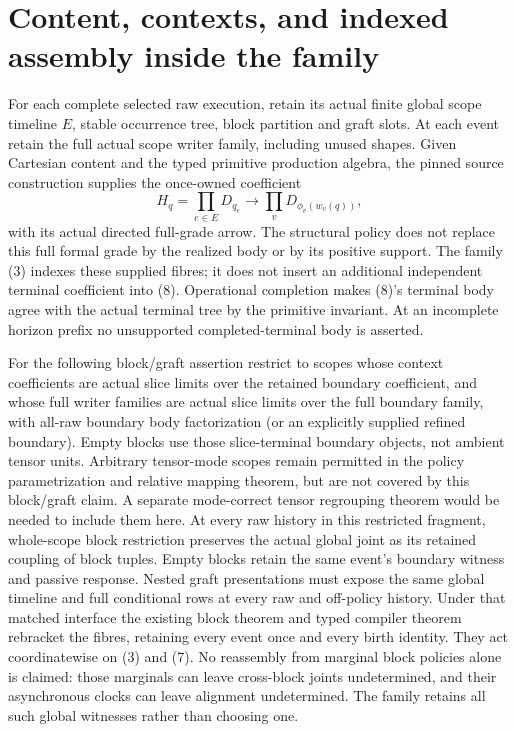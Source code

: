 \documentclass[11pt]{article}
\begin{document}
\section{Content, contexts, and indexed assembly inside the family}
For each complete selected raw execution, retain its actual finite global scope timeline $E$, stable occurrence tree, block partition and graft slots. At each event retain the full actual scope writer family, including unused shapes. Given Cartesian content and the typed primitive production algebra, the pinned source construction supplies the once-owned coefficient
\[
 H_q=\prod_{e\in E}D_{q_e}
 \longrightarrow\prod_{v}D_{\phi_v(w_v(q))},           \tag{8}
\]
with its actual directed full-grade arrow. The structural policy does not replace this full formal grade by the realized body or by its positive support. The family (3) indexes these supplied fibres; it does not insert an additional independent terminal coefficient into (8). Operational completion makes (8)'s terminal body agree with the actual terminal tree by the primitive invariant. At an incomplete horizon prefix no unsupported completed-terminal body is asserted.

For the following block/graft assertion restrict to scopes whose context coefficients are actual slice limits over the retained boundary coefficient, and whose full writer families are actual slice limits over the full boundary family, with all-raw boundary body factorization (or an explicitly supplied refined boundary). Empty blocks use those slice-terminal boundary objects, not ambient tensor units. Arbitrary tensor-mode scopes remain permitted in the policy parametrization and relative mapping theorem, but are not covered by this block/graft claim. A separate mode-correct tensor regrouping theorem would be needed to include them here. At every raw history in this restricted fragment, whole-scope block restriction preserves the actual global joint as its retained coupling of block tuples. Empty blocks retain the same event's boundary witness and passive response. Nested graft presentations must expose the same global timeline and full conditional rows at every raw and off-policy history. Under that matched interface the existing block theorem and typed compiler theorem rebracket the fibres, retaining every event once and every birth identity. They act coordinatewise on (3) and (7). No reassembly from marginal block policies alone is claimed: those marginals can leave cross-block joints undetermined, and their asynchronous clocks can leave alignment undetermined. The family retains all such global witnesses rather than choosing one.
\end{document}
